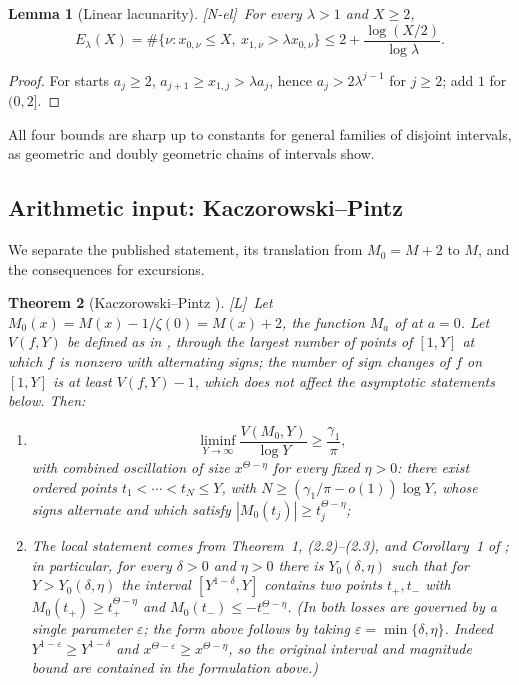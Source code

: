 \documentclass[11pt]{amsart}
\numberwithin{equation}{section}
\theoremstyle{plain}
\newtheorem{theorem}{Theorem}[section]
\newtheorem{lemma}[theorem]{Lemma}
\theoremstyle{definition}
\theoremstyle{remark}
\newcommand{\tagNE}{\textup{[N-el]}}
\newcommand{\tagL}{\textup{[L]}}
\begin{document}
\begin{lemma}[Linear lacunarity]
\label{lem:linear-lacunary}
\tagNE\ For every $\lambda>1$ and $X\ge2$,
\begin{equation}
\label{eq:linear-lacunary-count}
E_\lambda(X)=\#\{\nu:x_{0,\nu}\le X,\ x_{1,\nu}>\lambda x_{0,\nu}\}
\le2+\frac{\log(X/2)}{\log\lambda}.
\end{equation}
\end{lemma}

\begin{proof}
For starts $a_j\ge2$, $a_{j+1}\ge x_{1,j}>\lambda a_j$, hence
$a_j>2\lambda^{j-1}$ for $j\ge2$; add $1$ for $(0,2]$.
\end{proof}

All four bounds are sharp up to constants for general families of disjoint
intervals, as geometric and doubly geometric chains of intervals show.

\subsection{Arithmetic input: Kaczorowski--Pintz}

We separate the published statement, its translation from $M_0=M+2$ to
$M$, and the consequences for excursions.

\begin{theorem}[Kaczorowski--Pintz {\cite{KP86}}]
\label{thm:KP-quoted}
\tagL\ Let $M_0(x)=M(x)-1/\zeta(0)=M(x)+2$, the function $M_a$ of \cite{KP86} at
$a=0$. Let $V(f,Y)$ be defined as in \cite{KP86}, through the largest number of
points of $[1,Y]$ at which $f$ is nonzero with alternating signs; the number
of sign changes of $f$ on $[1,Y]$ is at least $V(f,Y)-1$, which does not
affect the asymptotic statements below. Then:
\begin{enumerate}[label=\textup{(\roman*)}]
\item \cite[Corollary~4, p.~178, (2.13)--(2.15)]{KP86}
\begin{equation}
\label{eq:KP-signchanges}
\liminf_{Y\to\infty}\frac{V(M_0,Y)}{\log Y}\ge\frac{\gamma_1}{\pi},
\end{equation}
with combined oscillation of size $x^{\Theta-\eta}$ for every fixed
$\eta>0$: there exist ordered points $t_1<\cdots<t_N\le Y$, with
$N\ge(\gamma_1/\pi-o(1))\log Y$, whose signs alternate and which satisfy
$|M_0(t_j)|\ge t_j^{\Theta-\eta}$;
\item The local statement comes from Theorem~1, (2.2)--(2.3), and
Corollary~1 of \cite{KP86}; in particular,
for every $\delta>0$ and $\eta>0$ there is $Y_0(\delta,\eta)$ such that for
$Y>Y_0(\delta,\eta)$ the interval $[Y^{1-\delta},Y]$ contains two points
$t_+,t_-$ with $M_0(t_+)\ge t_+^{\Theta-\eta}$ and
$M_0(t_-)\le-t_-^{\Theta-\eta}$. (In \cite{KP86} both losses are governed
by a single parameter $\varepsilon$; the form above follows by taking
$\varepsilon=\min\{\delta,\eta\}$.  Indeed
$Y^{1-\varepsilon}\ge Y^{1-\delta}$ and
$x^{\Theta-\varepsilon}\ge x^{\Theta-\eta}$, so the original
interval and magnitude bound are contained in the formulation above.)
\end{enumerate}
\end{theorem}
\end{document}
